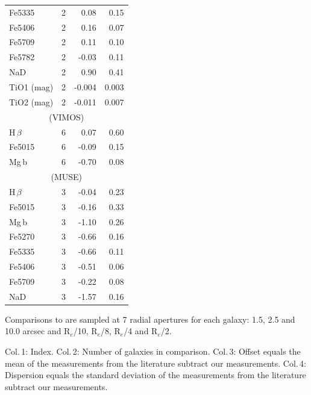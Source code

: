 \begin{table}
\begin{threeparttable}
\begin{tabular*}{0.8\textwidth}{@{\extracolsep{\fill}}l r r r}
					Fe5335 		& 2 		& 0.08\leavevmode\phantom{0}& 0.15\leavevmode\phantom{0}	\\
					Fe5406 		& 2 		& 0.16\leavevmode\phantom{0}& 0.07\leavevmode\phantom{0}	\\
					Fe5709 		& 2 		& 0.11\leavevmode\phantom{0}& 0.10\leavevmode\phantom{0}	\\
					Fe5782 		& 2 		& -0.03\leavevmode\phantom{0}& 0.11\leavevmode\phantom{0}	\\
					NaD 		& 2 		& 0.90\leavevmode\phantom{0}& 0.41\leavevmode\phantom{0}	\\
					TiO1 (mag)	& 2 		& -0.004	& 0.003	\\
					TiO2 (mag)	& 2 		& -0.011	& 0.007	\\
					\hline
					\multicolumn{4}{c}{\citet{Ogando2008} (VIMOS)} \\
					\hline
					H\,$\beta$ 	& 6 		& 0.07\leavevmode\phantom{0}& 0.60\leavevmode\phantom{0}	\\
					Fe5015 		& 6 		& -0.09\leavevmode\phantom{0}& 0.15\leavevmode\phantom{0}	\\
					Mg\,b 		& 6 		& -0.70\leavevmode\phantom{0}& 0.08\leavevmode\phantom{0}	\\
					\hline
					\multicolumn{4}{c}{\citet{Ogando2008} (MUSE)} \\
					\hline
					H\,$\beta$ 	& 3 		& -0.04\leavevmode\phantom{0}& 0.23\leavevmode\phantom{0}	\\ 
					Fe5015 		& 3 		& -0.16\leavevmode\phantom{0}& 0.33\leavevmode\phantom{0}	\\ 
					Mg\,b 		& 3 		& -1.10\leavevmode\phantom{0}& 0.26\leavevmode\phantom{0}	\\
					Fe5270 		& 3 		& -0.66\leavevmode\phantom{0}& 0.16\leavevmode\phantom{0}	\\
					Fe5335 		& 3 		& -0.66\leavevmode\phantom{0}& 0.11\leavevmode\phantom{0}	\\
					Fe5406 		& 3 		& -0.51\leavevmode\phantom{0}& 0.06\leavevmode\phantom{0}	\\
					Fe5709 		& 3 		& -0.22\leavevmode\phantom{0}& 0.08\leavevmode\phantom{0}	\\
					NaD 		& 3 		& -1.57\leavevmode\phantom{0}& 0.16\leavevmode\phantom{0}	\\
					\hline
					\hline
				\end{tabular*}
				\begin{tablenotes}
				\footnotesize
				\note Comparisons to \citet{Rampazzo2005} are sampled at 7 radial apertures for each galaxy: 1.5, 2.5 and 10.0 arcsec and R$_e$/10, R$_e$/8, R$_e$/4 and R$_e$/2. 
				\item Col.\,1: Index. Col.\,2: Number of galaxies in comparison. Col.\,3: Offset equals the mean of the measurements from the literature subtract our measurements. Col.\,4: Dispersion equals the standard deviation of the measurements from the literature subtract our measurements.
				\end{tablenotes}
			\end{threeparttable}
			\end{table}

